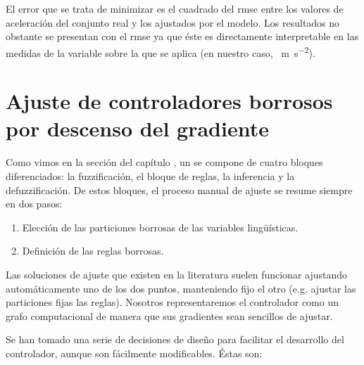 El error que se trata de minimizar es el cuadrado del \gls{rmse} entre los valores de aceleración del conjunto real y los ajustados por el modelo. Los resultados no obstante se presentan con el \gls{rmse} ya que éste es directamente interpretable en las medidas de la variable sobre la que se aplica (en nuestro caso, \SI{}{\metre\per\square\second}).

\section{Ajuste de controladores borrosos por descenso del gradiente}
\label{ss:fuzzy-controller-adjustment}

Como vimos en la sección  del capítulo , un  se compone de cuatro bloques diferenciados: la fuzzificación, el bloque de reglas, la inferencia y la defuzzificación. De estos bloques, el proceso manual de ajuste se resume siempre en dos pasos:

\begin{enumerate}
	\item Elección de las particiones borrosas de las variables lingüísticas.
	\item Definición de las reglas borrosas.
\end{enumerate}

Las soluciones de ajuste que existen en la literatura suelen funcionar ajustando automáticamente uno de los dos puntos, manteniendo fijo el otro (e.g. ajustar las particiones fijas las reglas). Nosotros representaremos el controlador como un grafo computacional de manera que sus gradientes sean sencillos de ajustar.

Se han tomado una serie de decisiones de diseño para facilitar el desarrollo del controlador, aunque son fácilmente modificables. Éstas son:

